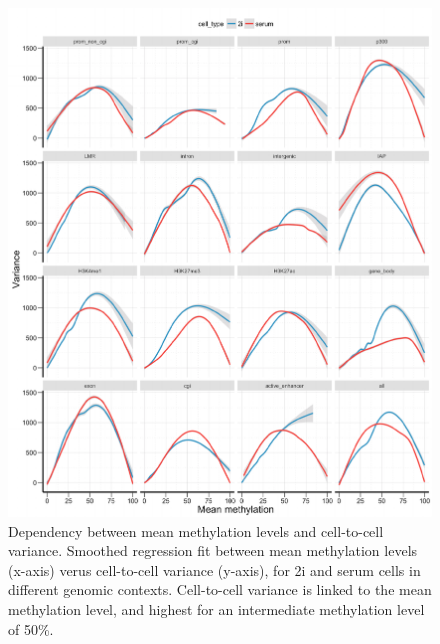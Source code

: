 \begin{figure}[htbp!]
\centering
\includegraphics[width=1.0\textwidth]{var_couple}
\caption[Dependency between mean methylation levels and cell-to-cell variance.]{Dependency between mean methylation levels and cell-to-cell variance. Smoothed regression fit between mean methylation levels (x-axis) verus cell-to-cell variance (y-axis), for 2i and serum cells in different genomic contexts. Cell-to-cell variance is linked to the mean methylation level, and highest for an intermediate methylation level of 50\%.}
\label{fig:dcpg_var_couple}
\end{figure}

